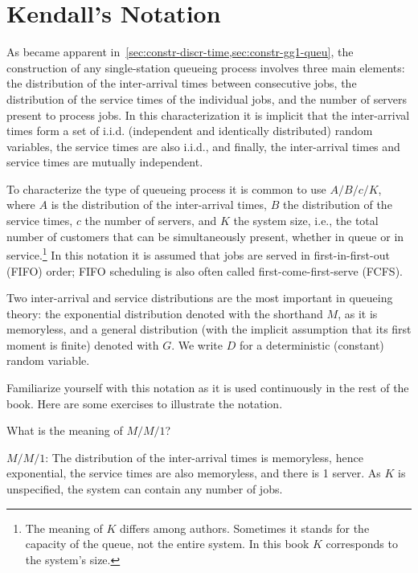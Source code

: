 \section{Kendall's Notation}
\label{sec:kendalls-notation}





As became apparent in~\cref{sec:constr-discr-time,sec:constr-gg1-queu}, the construction of any single-station queueing process involves three main elements: the distribution of the inter-arrival times between consecutive jobs, the distribution of the service times of the individual jobs, and the number of servers present to process jobs.
In this characterization it is implicit that the inter-arrival times form a set of i.i.d.
(independent and identically distributed) random variables, the service times are also i.i.d., and finally, the inter-arrival times and service times are mutually independent.

To characterize the type of queueing process it is common to use 
 $A/B/c/K$, where $A$ is the distribution of the
inter-arrival times, $B$ the distribution of the service times, $c$ the
number of servers, and $K$ the system size, i.e., the total number of customers that can be simultaneously present, whether in queue or in service.\footnote{The meaning of $K$ differs among authors. Sometimes it stands for
  the capacity of the queue, not the entire system. In this book $K$ corresponds to the system's size.}
In this notation it is assumed that jobs are served in
first-in-first-out (FIFO) order; FIFO scheduling is also often called
first-come-first-serve (FCFS). 

Two inter-arrival and service distributions are the most important in queueing theory: the exponential distribution denoted with the shorthand $M$, as it is memoryless, and a general distribution (with the implicit assumption that its first moment is finite) denoted with $G$. We write $D$ for a deterministic (constant) random variable. 

Familiarize yourself with this notation as it is used continuously in the rest of the book. Here are some exercises to illustrate the notation.

\begin{extra}
  What is the meaning of $M/M/1$?
  \begin{solution}
$M/M/1$: The distribution of the inter-arrival times is
  memoryless, hence exponential, the service times are also
  memoryless, and there is 1 server. As $K$ is unspecified, the system can contain any number of jobs.
  \end{solution}
\end{extra}

